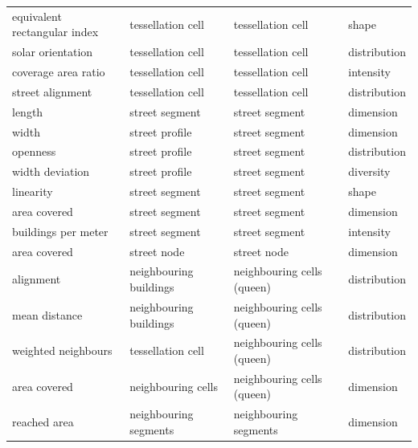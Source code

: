 \begin{longtable}{p{5cm}p{4cm}p{4cm}l}
            equivalent rectangular index &               tessellation cell &          tessellation cell &        shape \\
                       solar orientation &               tessellation cell &          tessellation cell & distribution \\
                     coverage area ratio &               tessellation cell &          tessellation cell &    intensity \\
                        street alignment &               tessellation cell &          tessellation cell & distribution \\
                                  length &                  street segment &             street segment &    dimension \\
                                   width &                  street profile &             street segment &    dimension \\
                                openness &                  street profile &             street segment & distribution \\
                         width deviation &                  street profile &             street segment &    diversity \\
                               linearity &                  street segment &             street segment &        shape \\
                            area covered &                  street segment &             street segment &    dimension \\
                     buildings per meter &                  street segment &             street segment &    intensity \\
                            area covered &                     street node &                street node &    dimension \\
                               alignment &          neighbouring buildings & neighbouring cells (queen) & distribution \\
                           mean distance &          neighbouring buildings & neighbouring cells (queen) & distribution \\
                     weighted neighbours &               tessellation cell & neighbouring cells (queen) & distribution \\
                            area covered &              neighbouring cells & neighbouring cells (queen) &    dimension \\
                            reached area &           neighbouring segments &      neighbouring segments &    dimension \\

\end{longtable}
